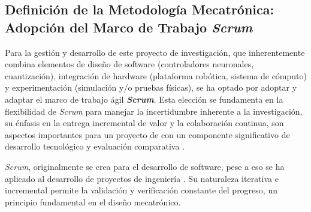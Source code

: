\documentclass[12pt]{article}
\begin{document}
\subsection{Definición de la Metodología Mecatrónica: Adopción del Marco de Trabajo \textit{Scrum}}
\label{ssec:metodologia_scrum}

Para la gestión y desarrollo de este proyecto de investigación, que inherentemente combina elementos de diseño de software (controladores neuronales, cuantización), integración de hardware (plataforma robótica, sistema de cómputo) y experimentación (simulación y/o pruebas físicas), se ha optado por adoptar y adaptar el marco de trabajo ágil \textbf{\textit{Scrum}}. Esta elección se fundamenta en la flexibilidad de \textit{Scrum} para manejar la incertidumbre inherente a la investigación, su énfasis en la entrega incremental de valor y la colaboración continua, son aspectos importantes para un proyecto de con un componente significativo de desarrollo tecnológico y evaluación comparativa \cite{Schwaber2020ScrumGuide}.

\textit{Scrum}, originalmente se crea para el desarrollo de software, pese a eso se ha aplicado al desarrollo de proyectos de ingeniería \cite{cano2021scrum}. Su naturaleza iterativa e incremental permite la validación y verificación constante del progreso, un principio fundamental en el diseño mecatrónico.
\end{document}
